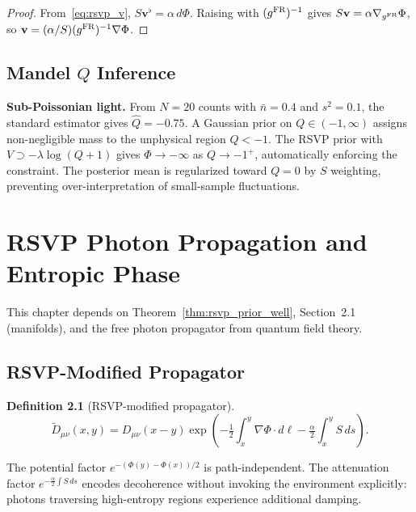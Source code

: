 \documentclass[11pt, openright, twoside]{book}
\theoremstyle{plain}
\theoremstyle{definition}
\newtheorem{definition}[theorem]{Definition}
\theoremstyle{remark}
\newcommand{\vfield}{\mathbf{v}}
\newcommand{\Sfield}{S}
\begin{document}
\begin{proof}
From~\eqref{eq:rsvp_v}, $\Sfield\vfield^\flat=\alpha\,d\Phi$. Raising with $(g^{\rm FR})^{-1}$
gives $\Sfield\vfield=\alpha\nabla_{g^{\rm FR}}\Phi$, so $\vfield=(\alpha/\Sfield)(g^{\rm FR})^{-1}\nabla\Phi$.
\end{proof}

\section{Mandel $Q$ Inference}

\begin{exbox}
\textbf{Sub-Poissonian light.} From $N=20$ counts with $\bar n=0.4$ and $s^2=0.1$,
the standard estimator gives $\hat Q=-0.75$. A Gaussian prior on $Q\in(-1,\infty)$ assigns
non-negligible mass to the unphysical region $Q<-1$. The RSVP prior with
$V\supset-\lambda\log(Q+1)$ gives $\Phi\to-\infty$ as $Q\to-1^+$, automatically enforcing
the constraint. The posterior mean is regularized toward $Q=0$ by $\Sfield$ weighting,
preventing over-interpretation of small-sample fluctuations.
\end{exbox}

\chapter{RSVP Photon Propagation and Entropic Phase}

\begin{depbox}
This chapter depends on Theorem~\ref{thm:rsvp_prior_well}, Section~2.1 (manifolds),
and the free photon propagator from quantum field theory.
\end{depbox}

\section{RSVP-Modified Propagator}

\begin{definition}[RSVP-modified propagator]
\begin{equation}
  \widetilde D_{\mu\nu}(x,y) = D_{\mu\nu}(x-y)
  \exp\!\left(-\tfrac{1}{2}\int_x^y\nabla\Phi\cdot d\ell
  -\tfrac{\alpha}{2}\int_x^y\Sfield\,ds\right).
  \label{eq:rsvp_propagator}
\end{equation}
\end{definition}

The potential factor $e^{-(\Phi(y)-\Phi(x))/2}$ is path-independent. The attenuation
factor $e^{-\frac{\alpha}{2}\int\Sfield\,ds}$ encodes decoherence without invoking the
environment explicitly: photons traversing high-entropy regions experience additional damping.
\end{document}
